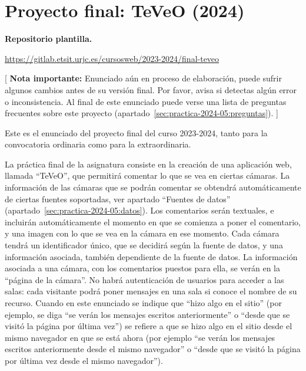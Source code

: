 \section{Proyecto final: TeVeO (2024)}
\label{practica-final-2024-05}

\textbf{Repositorio plantilla.}

\url{https://gitlab.etsit.urjc.es/cursosweb/2023-2024/final-teveo}

[ \textbf{Nota importante:} Enunciado aún en proceso de elaboración, puede sufrir algunos cambios antes de su versión final. Por favor, avisa si detectas algún error o inconsistencia. Al final de este enunciado puede verse una lista de preguntas frecuentes sobre este proyecto (apartado~\ref{sec:practica-2024-05:preguntas}). ]


Este es el enunciado del proyecto final del curso 2023-2024, tanto para la convocatoria ordinaria como para la extraordinaria.

La práctica final de la asignatura consiste en la creación de una aplicación web, llamada ``TeVeO'', que permitirá comentar lo que se vea en ciertas cámaras. La información de las cámaras que se podrán comentar se obtendrá automáticamente de ciertas fuentes soportadas, ver apartado ``Fuentes de datos'' (apartado~\ref{sec:practica-2024-05:datos}). Los comentarios serán textuales, e incluirán automáticamente el momento en que se comienza a poner el comentario, y una imagen con lo que se vea en la cámara en ese momento. Cada cámara tendrá un identificador único, que se decidirá según la fuente de datos, y una información asociada, también dependiente de la fuente de datos. La información asociada a una cámara, con los comentarios puestos para ella, se verán en la ``página de la cámara''. No habrá autenticación de usuarios para acceder a las salas: cada visitante podrá poner mensajes en una sala si conoce el nombre de su recurso. Cuando en este enunciado se indique que ``hizo algo en el sitio'' (por ejemplo, se diga ``se verán los mensajes escritos anteriormente'' o ``desde que se visitó la página por última vez'') se refiere a que se hizo algo en el sitio desde el mismo navegador en que se está ahora (por ejemplo ``se verán los mensajes escritos anteriormente desde el mismo navegador'' o ``desde que se visitó la página por última vez desde el mismo navegador'').

